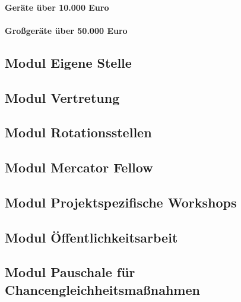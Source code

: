\documentclass[de]{dfg-proposal}
\begin{document}
\paragraph{Geräte über 10.000 Euro}

\paragraph{Großgeräte über 50.000 Euro}

\subsection{Modul Eigene Stelle}

\subsection{Modul Vertretung}

\subsection{Modul Rotationsstellen}

\subsection{Modul Mercator Fellow}

\subsection{Modul Projektspezifische Workshops}

\subsection{Modul Öffentlichkeitsarbeit}

\subsection{Modul Pauschale für Chancengleichheitsmaßnahmen}
\end{document}
